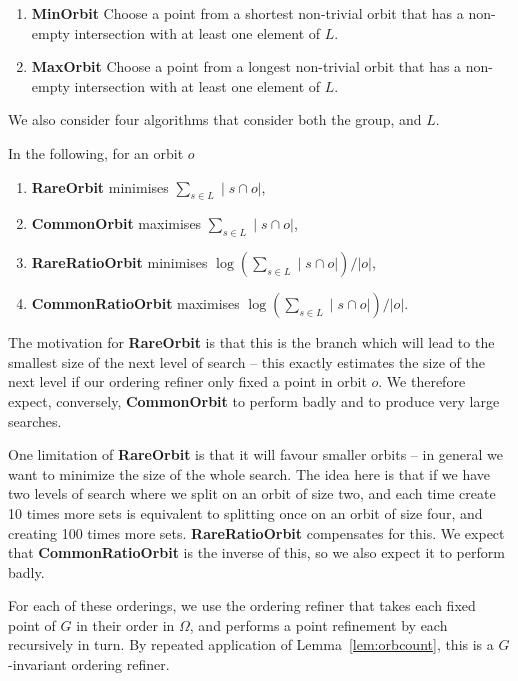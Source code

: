 \begin{enumerate}
\item \textbf{MinOrbit} Choose a point from a shortest non-trivial orbit that
  has a non-empty intersection with at least one element of \(L\).
\item \textbf{MaxOrbit} Choose a point from a longest non-trivial orbit that
  has a non-empty intersection with at least one element of $L$.
\end{enumerate}

We also consider four algorithms that consider both the group, and \(L\).

In the following, for an orbit \(o\)
\begin{enumerate}
\item \textbf{RareOrbit} minimises \(\sum\limits_{s \in L}\mid s \cap o|\),
\item \textbf{CommonOrbit} maximises \(\sum\limits_{s \in L}\mid s \cap o|\),
\item \textbf{RareRatioOrbit} minimises \({\log(\sum\limits_{s \in L}\mid s \cap o|)}/{|o|}\),
\item \textbf{CommonRatioOrbit} maximises \({\log(\sum\limits_{s \in L}\mid s \cap o|)}/{|o|}\).
\end{enumerate}

The motivation for \textbf{RareOrbit} is that this is the branch which will lead
to the smallest size of the next level of search -- this exactly estimates the
size of the next level if our ordering refiner only fixed a point in orbit
\(o\). We therefore expect, conversely, \textbf{CommonOrbit} to perform badly and to
produce very large searches.

One limitation of \textbf{RareOrbit} is that it will favour smaller orbits -- in
general we want to minimize the size of the whole search. The idea here is that
if we have two levels of search where we split on an orbit of size two, and each
time create 10 times more sets is equivalent to splitting once on an orbit of
size four, and creating 100 times more sets. \textbf{RareRatioOrbit} compensates
for this. We expect that \textbf{CommonRatioOrbit} is the inverse of this, so we also
expect it to perform badly.

For each of these orderings, we use the ordering refiner that
takes each fixed point of \(G\) in their order in \(\Omega\), and performs a point
refinement by each recursively in turn. By repeated application of
Lemma~\ref{lem:orbcount}, this is a \(G\)-invariant ordering refiner.

